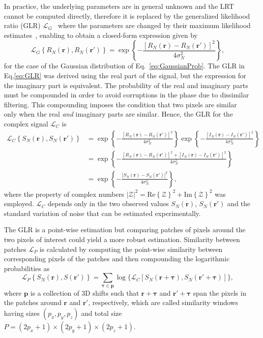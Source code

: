 In practice, the underlying parameters are in general unknown and the LRT cannot be computed directly, therefore it is replaced by the generalized likelihood ratio (GLR) $\mathcal{L}_G$~\cite{Cuartas-Velez2018_Volumetric} where the parameters are changed by their maximum likelihood estimates~\cite{Deledalle2012_How}, enabling to obtain a closed-form expression given by
\begin{equation}\label{eq:GLR}
    \mathcal{L}_G\left\{R_N(\bm{r}), R_N(\bm{r}')\right\} = \exp\left\{-\frac{[R_N(\bm{r}) - R_N(\bm{r}')]^2} {4\sigma_N^2}\right\},
\end{equation}
for the case of the Gaussian distribution of Eq.~\eqref{eq:GaussianProb}. The GLR in Eq,\eqref{eq:GLR} was derived using the real part of the signal, but the expression for the imaginary part is equivalent. The probability of the real and imaginary parts must be compounded in order to avoid corruptions in the phase due to dissimilar filtering. This compounding imposes the condition that two pixels are similar only when the real \textit{and} imaginary parts are similar. Hence, the GLR for the complex signal $\mathcal{L}_C$ is
\begin{align}\label{eq:GLR_total}
    \mathcal{L}_C\left\{S_N(\bm{r}), S_N(\bm{r}')\right\} &= \exp\left\{-\frac{[R_N(\bm{r}) - R_N(\bm{r}')]^2} {4\sigma_N^2}\right\} \exp\left\{-\frac{[I_N(\bm{r}) - I_N(\bm{r}')]^2} {4\sigma_N^2}\right\} \nonumber\\
    &=  \exp\left\{-\frac{[R_N(\bm{r}) - R_N(\bm{r}')]^2 + [I_N(\bm{r}) - I_N(\bm{r}')]^2} {4\sigma_N^2}\right\} \nonumber\\
    &= \exp\left\{-\frac{|S_N(\bm{r}) - S_N(\bm{r}')|^2} {4\sigma_N^2}\right\},
\end{align}
where the property of complex numbers $|\mathcal{Z}|^2 = \text{Re}\left\{\mathcal{Z}\right\}^2 + \text{Im}\left\{\mathcal{Z}\right\}^2$ was employed. $\mathcal{L}_C$ depends only in the two observed values $S_N(\bm{r})$, $S_N(\bm{r}')$ and the standard variation of noise that can be estimated experimentally. 

The GLR is a point-wise estimation but comparing patches of pixels around the two pixels of interest could yield a more robust estimation. Similarity between patches $\mathcal{L}_{P}$ is calculated by computing the point-wise similarity between corresponding pixels of the patches and then compounding the logarithmic probabilities as
\begin{equation}
    \mathcal{L}_{P}\left\{S_N(\bm{r}), S(\bm{r}')\right\} = \sum_{\bm{\tau}\in\bm{p}}\log\{\mathcal{L}_C[S_N(\bm{r}+\bm{\tau}), S_N(\bm{r}'+\bm{\tau})]\},
\end{equation}
where $\bm{p}$ is a collection of 3D shifts such that $\bm{r}+\bm{\tau}$ and $\bm{r}'+\bm{\tau}$ span the pixels in the patches around $\bm{r}$ and $\bm{r'}$, respectively, which are called similarity windows having sizes $(p_x, p_y, p_z)$ and total size $P=(2p_x+1)\times(2p_y+1)\times(2p_z+1)$.


